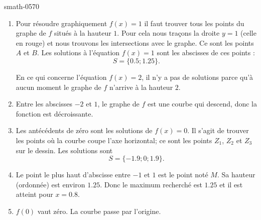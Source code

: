 
\begin{corrige}{smath-0570}

        \begin{center}
            
        \end{center}

\begin{enumerate}
    \item
        Pour résoudre graphiquement \( f(x)=1\) il faut trouver tous les points du graphe de \( f\) situés à la hauteur \( 1\). Pour cela nous traçons la droite \( y=1\) (celle en rouge) et nous trouvons les intersections avec le graphe. Ce sont les points \( A\) et \( B\). Les solutions à l'équation \( f(x)=1\) sont les abscisses de ces points :
        \begin{equation}
            S=\{ 0.5;1.25 \}.
        \end{equation}
        
        En ce qui concerne l'équation \( f(x)=2\), il n'y a pas de solutions parce qu'à aucun moment le graphe de \( f\) n'arrive à la hauteur \( 2\).

    \item

        Entre les abscisses \( -2\) et \( 1\), le graphe de \( f\) est une courbe qui descend, donc la fonction est décroissante.

    \item

        Les antécédents de zéro sont les solutions de \( f(x)=0\). Il s'agit de trouver les points où la courbe coupe l'axe horizontal; ce sont les points \( Z_1\), \( Z_2\) et \( Z_3\) sur le dessin. Les solutions sont
        \begin{equation}
            S=\{ -1.9;0;1.9 \}.
        \end{equation}
        
    \item

        Le point le plus haut d'abscisse entre \( -1\) et \( 1\) est le point noté \( M\). Sa hauteur (ordonnée) est environ \( 1.25\). Donc le maximum recherché est \( 1.25\) et il est atteint pour \( x=0.8\).

    \item

        \( f(0)\) vaut zéro. La courbe passe par l'origine.


\end{enumerate}
\end{corrige}
